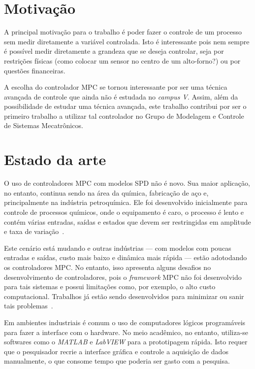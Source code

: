 \section{Motivação}%
\label{sec:motivacao}

A principal motivação para o trabalho é poder fazer o controle de um processo
sem medir diretamente a variável controlada. Isto é interessante pois nem sempre
é possível medir diretamente a grandeza que se deseja controlar, seja por
restrições físicas (como colocar um sensor no centro de um alto-forno?) ou por
questões financeiras.

A escolha do controlador \ac{MPC} se tornou interessante por ser uma técnica
avançada de controle que ainda não é estudada no \textit{campus V}. Assim, além
da possibilidade de estudar uma técnica avançada, este trabalho contribui por
ser o primeiro trabalho a utilizar tal controlador no Grupo de Modelagem e
Controle de Sistemas Mecatrônicos.

\section{Estado da arte}%
\label{sec:estado-da-arte}

O uso de controladores \ac{MPC} com modelos \ac{SPD} não é novo. Sua maior
aplicação, no entanto, continua sendo na área da química, fabricação de aço e,
principalmente na indústria petroquímica. Ele foi desenvolvido inicialmente para
controle de processos químicos, onde o equipamento é caro, o processo é lento e
contém várias entradas, saídas e estados que devem ser restringidas em amplitude
e taxa de variação~\cite{article:cairano}.

Este cenário está mudando e outras indústrias --- com modelos com poucas
entradas e saídas, custo mais baixo e dinâmica mais rápida --- estão adotodando
os controladores \ac{MPC}\@. No entanto, isso apresenta alguns desafios no
desenvolvimento de controladores, pois o \textit{framework} \ac{MPC} não foi
desenvolvido para tais sistemas e possui limitações como, por exemplo, o alto
custo computacional. Trabalhos já estão sendo desenvolvidos para minimizar ou
sanir tais problemas~\cite{article:cairano}.

Em ambientes industriais é comum o uso de computadores lógicos programáveis para
fazer a interface com o hardware. No meio acadêmico, no entanto, utiliza-se
softwares como o \textit{MATLAB} e \textit{LabVIEW} para a prototipagem rápida.
Isto requer que o pesquisador recrie a interface gráfica e controle a aquisição
de dados manualmente, o que consome tempo que poderia ser gasto com a pesquisa.

